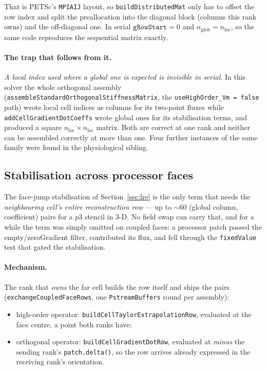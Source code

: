 \documentclass[11pt,a4paper]{article}
\newcommand{\code}[1]{\texttt{\small #1}}
\begin{document}
That is PETSc's \code{MPIAIJ} layout, so \code{buildDistributedMat} only has to
offset the row index and split the preallocation into the diagonal block
(columns this rank owns) and the off-diagonal one. In serial
$\texttt{gRowStart}=0$ and $n_{\text{glob}}=n_{\text{loc}}$, so the same code
reproduces the sequential matrix exactly.

\paragraph{The trap that follows from it.} \emph{A local index used where a
global one is expected is invisible in serial.} In this solver the whole
orthogonal assembly (\code{assembleStandardOrthogonalStiffnessMatrix}, the
\code{useHighOrder\_Vm = false} path) wrote local cell indices as columns for
its two-point fluxes while \code{addCellGradientDotCoeffs} wrote global ones
for its stabilisation terms, and produced a square $n_{\text{loc}}\times
n_{\text{loc}}$ matrix. Both are correct at one rank and neither can be
assembled correctly at more than one. Four further instances of the same family
were found in the physiological sibling.

\subsection{Stabilisation across processor faces}
\label{sec:dist-stab}

The face-jump stabilisation of Section~\ref{sec:lre} is the only term that
needs the \emph{neighbouring cell's entire reconstruction row} --- up to
$\sim60$ (global column, coefficient) pairs for a $p3$ stencil in 3-D. No field
swap can carry that, and for a while the term was simply omitted on coupled
faces: a processor patch passed the empty/zeroGradient filter, contributed its
flux, and fell through the \code{fixedValue} test that gated the stabilisation.

\paragraph{Mechanism.} The rank that \emph{owns} the far cell builds the row
itself and ships the pairs (\code{exchangeCoupledFaceRows}, one
\code{PstreamBuffers} round per assembly):

\begin{itemize}
  \item high-order operator: \code{buildCellTaylorExtrapolationRow}, evaluated
        at the face centre, a point both ranks have;
  \item orthogonal operator: \code{buildCellGradientDotRow}, evaluated at
        \emph{minus} the sending rank's \code{patch.delta()}, so the row
        arrives already expressed in the receiving rank's orientation.
\end{itemize}
\end{document}
